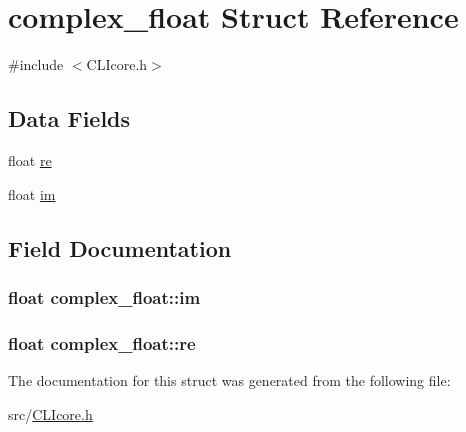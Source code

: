 \hypertarget{structcomplex__float}{}\section{complex\+\_\+float Struct Reference}
\label{structcomplex__float}


{\ttfamily \#include $<$C\+L\+Icore.\+h$>$}

\subsection*{Data Fields}
\begin{DoxyCompactItemize}
\item 
float \hyperlink{structcomplex__float_a170e8285dc5452b1c27d6a97590509dd}{re}
\item 
float \hyperlink{structcomplex__float_a96d96e19d16b6b08e43fb799c6406f0a}{im}
\end{DoxyCompactItemize}


\subsection{Field Documentation}
\hypertarget{structcomplex__float_a96d96e19d16b6b08e43fb799c6406f0a}{}
\subsubsection[{im}]{\setlength{\rightskip}{0pt plus 5cm}float complex\+\_\+float\+::im}\label{structcomplex__float_a96d96e19d16b6b08e43fb799c6406f0a}
\hypertarget{structcomplex__float_a170e8285dc5452b1c27d6a97590509dd}{}
\subsubsection[{re}]{\setlength{\rightskip}{0pt plus 5cm}float complex\+\_\+float\+::re}\label{structcomplex__float_a170e8285dc5452b1c27d6a97590509dd}


The documentation for this struct was generated from the following file\+:\begin{DoxyCompactItemize}
\item 
src/\hyperlink{CLIcore_8h}{C\+L\+Icore.\+h}\end{DoxyCompactItemize}
